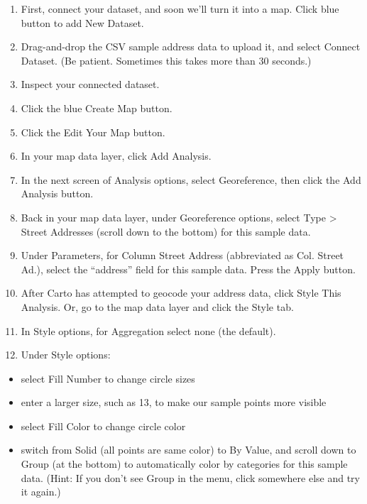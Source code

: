 \documentclass[
  english,
]{book}
\providecommand{\tightlist}{%
  \setlength{\itemsep}{0pt}\setlength{\parskip}{0pt}}
\begin{document}
\begin{enumerate}
\def\labelenumi{\arabic{enumi})}
\setcounter{enumi}{3}
\item
  First, connect your dataset, and soon we'll turn it into a map. Click blue button to add New Dataset.
\item
  Drag-and-drop the CSV sample address data to upload it, and select Connect Dataset. (Be patient. Sometimes this takes more than 30 seconds.)
\item
  Inspect your connected dataset.
\item
  Click the blue Create Map button.
\item
  Click the Edit Your Map button.
\item
  In your map data layer, click Add Analysis.
\item
  In the next screen of Analysis options, select Georeference, then click the Add Analysis button.
\item
  Back in your map data layer, under Georeference options, select Type \textgreater{} Street Addresses (scroll down to the bottom) for this sample data.
\item
  Under Parameters, for Column Street Address (abbreviated as Col. Street Ad.), select the ``address'' field for this sample data. Press the Apply button.
\item
  After Carto has attempted to geocode your address data, click Style This Analysis. Or, go to the map data layer and click the Style tab.
\item
  In Style options, for Aggregation select none (the default).
\item
  Under Style options:
\end{enumerate}

\begin{itemize}
\tightlist
\item
  select Fill Number to change circle sizes
\item
  enter a larger size, such as 13, to make our sample points more visible
\item
  select Fill Color to change circle color
\item
  switch from Solid (all points are same color) to By Value, and scroll down to Group (at the bottom) to automatically color by categories for this sample data. (Hint: If you don't see Group in the menu, click somewhere else and try it again.)
\end{itemize}
\end{document}
